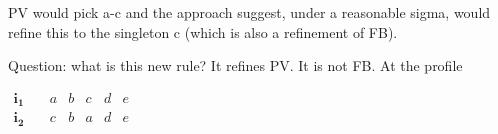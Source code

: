\documentclass[version=3.21, pagesize, twoside=off, bibliography=totoc, DIV=calc, fontsize=12pt, a4paper]{scrartcl}
\begin{document}
PV would pick a-c and the approach suggest, under a reasonable sigma, would refine this to the singleton c (which is also a refinement of FB).

Question: what is this new rule? It refines PV. It is not FB. At the profile

\begin{center}
	$
	\begin{array}{cccccc}
		\mathbf{i_1} \quad &a&b&c&d&e\\
		\mathbf{i_2} \quad &c&b&a&d&e\\
	\end{array}
	$
\end{center}
\end{document}
